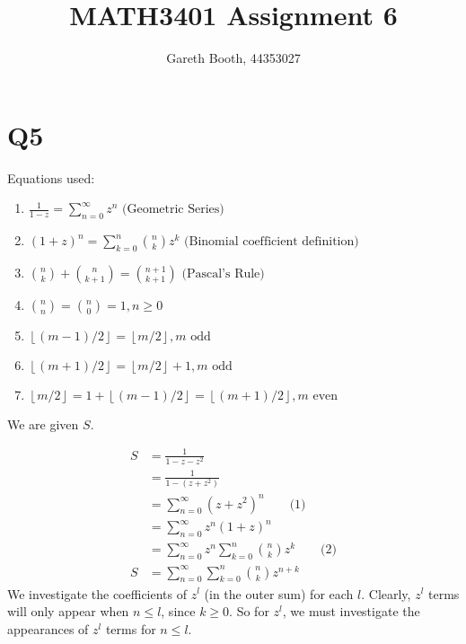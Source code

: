\documentclass[11pt]{article}
\title{MATH3401 Assignment 6}
\author{Gareth Booth, 44353027}
\begin{document}
\maketitle

\section{Q5}
Equations used:
\begin{enumerate}
  \item $\displaystyle \frac{1}{1-z}=\sum_{n=0}^{\infty} z^n\text{ (Geometric Series)}$
  \item $\displaystyle \left(1+z\right)^n=\sum_{k=0}^n {n\choose k}z^k\text{ (Binomial coefficient definition)}$
  \item $\displaystyle {n \choose k} + {n \choose k+1} = {n+1 \choose k+1}\text{ (Pascal's Rule)}$
  \item $\displaystyle {n \choose n} = {n \choose 0} = 1, n\geq 0$
  \item $\left\lfloor \left(m-1\right)/2\right\rfloor=\left\lfloor m/2\right\rfloor,m\text{ odd}$
  \item $\left\lfloor \left(m+1\right)/2\right\rfloor=\left\lfloor m/2\right\rfloor+1,m\text{ odd}$
  \item $\left\lfloor m/2\right\rfloor=1+\left\lfloor \left(m-1\right)/2\right\rfloor=\left\lfloor \left(m+1\right)/2\right\rfloor, m\text{ even}$
\end{enumerate}
We are given $S$.


\begin{align*} 
S   &=\frac{1}{1-z-z^2} \\ 
    &=\frac{1}{1-\left(z+z^2\right)}\\
    &=\sum_{n=0}^{\infty} \left(z+z^2\right)^n\qquad\text{(1)}\\
    &=\sum_{n=0}^{\infty}z^n \left(1+z\right)^n\\
    &=\sum_{n=0}^{\infty}z^n \sum_{k=0}^n {n\choose k}z^k\qquad\text{(2)}\\
S   &=\sum_{n=0}^{\infty}\sum_{k=0}^n {n\choose k}z^{n+k}
\end{align*}
We investigate the coefficients of $z^l$ (in the outer sum) for each $l$. Clearly, $z^l$ terms will only appear when $n\leq l$, since $k\geq 0$.
So for $z^l$, we must investigate the appearances of $z^l$ terms for $n\leq l$.
\end{document}
